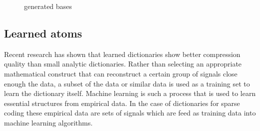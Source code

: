 \begin{figure}
\centering
{}
\hspace{5mm}
\hspace{5mm}
\caption{generated bases}

\label{fig:generated_atoms}
\end{figure}

\subsection{Learned atoms}
Recent research\cite{Chen1998,Aharon2006,Mairal2010} has shown that learned
dictionaries show better compression quality than small analytic
dictionaries. Rather than selecting an appropriate mathematical construct that
can reconstruct a certain group of signals close enough the data, a subset of
the data or similar data is used as a training set to learn the dictionary
itself.
Machine learning is such a process that is used to learn essential structures
from empirical data. In the case of dictionaries for sparse coding these
empirical data are sets of signals which are feed as training data into machine
learning algorithms.

